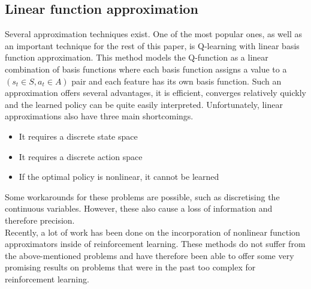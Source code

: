 \subsection{Linear function approximation}
Several approximation techniques exist. One of the most popular ones, as well as an important technique for the rest of this paper,  is Q-learning with linear basis function approximation. This method models the Q-function as a linear combination of basis functions where each basis function assigns a value to a $(s_t \in S,a_t \in A)$ pair and each feature has its own basis function. Such an approximation offers several advantages, it is efficient, converges relatively quickly and the learned policy can be quite easily interpreted. Unfortunately, linear approximations also have three main shortcomings.
\begin{itemize}
    \item It requires a discrete state space
    \item It requires a discrete action space
    \item If the optimal policy is nonlinear, it cannot be learned
\end{itemize}
Some workarounds for these problems are possible, such as discretising the continuous variables. However, these also cause a loss of information and therefore precision.\\
Recently, a lot of work has been done on the incorporation of nonlinear function approximators inside of reinforcement learning. These methods do not suffer from the above-mentioned problems and have therefore been able to offer some very promising results on problems that were in the past too complex for reinforcement learning.
